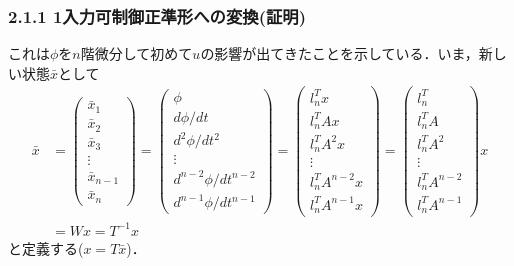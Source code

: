 \begin{frame}[t]
\frametitle{2.1.1 1入力可制御正準形への変換(証明)}
これは$\phi$を$n$階微分して初めて$u$の影響が出てきたことを示している．いま，新しい状態$\bar{x}$として
\begin{align} 
	\bar{x}
	& =
	\left(\begin{array}{c}
	     \bar{x}_1 \\
	     \bar{x}_2 \\
	     \bar{x}_3 \\
		 \vdots \\
	     \bar{x}_{n-1} \\
	     \bar{x}_n
	\end{array}\right)
	=
	\left(\begin{array}{c}
	     \phi \\
	     d \phi /dt \\
	     d^2 \phi /dt^2 \\
		 \vdots \\
	     d^{n-2} \phi /dt^{n-2} \\
	     d^{n-1} \phi /dt^{n-1}
	\end{array}\right)
	=
	\left(\begin{array}{c}
	     l_n^T x \\
	     l_n^T A x \\
	     l_n^T A^2 x \\
		 \vdots \\
	     l_n^T A^{n-2} x \\
	     l_n^T A^{n-1} x
	\end{array}\right)
	=
	\left(\begin{array}{c}
	     l_n^T  \\
	     l_n^T A  \\
	     l_n^T A^2  \\
		 \vdots \\
	     l_n^T A^{n-2}  \\
	     l_n^T A^{n-1} 
	\end{array}\right)
	x
\nonumber \\ &
	= Wx
	= T^{-1}x
\end{align}
と定義する($x = T \bar{x}$)．
\end{frame}

